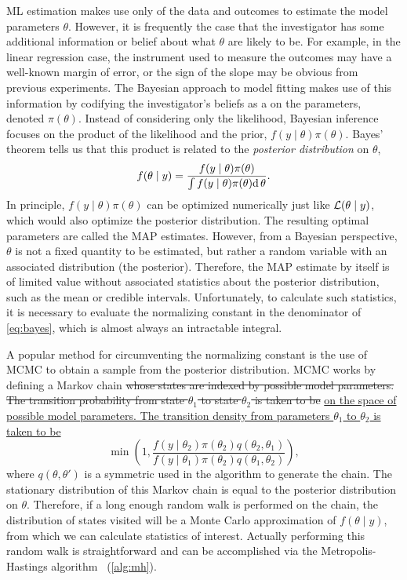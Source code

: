 \Gls{ML} estimation makes use only of the data and outcomes to estimate the
model parameters $\theta$. However, it is frequently the case that the
investigator has some additional information or belief about what $\theta$ are
likely to be. For example, in the linear regression case, the instrument used
to measure the outcomes may have a well-known margin of error, or the sign of
the slope may be obvious from previous experiments. The Bayesian approach to
model fitting makes use of this information by codifying the investigator's
beliefs as a  on the parameters, denoted
$\pi(\theta)$. Instead of considering only the likelihood, Bayesian inference
focuses on the product of the likelihood and the prior, $f(y \mid \theta)
\pi(\theta)$. Bayes' theorem tells us that this product is related to the
\textit{posterior distribution} on $\theta$,
\begin{align}
  f(\theta \mid y) 
    = \frac{f(y \mid \theta) \pi(\theta)}
           {\int f(y \mid \theta) \pi(\theta) \mathrm{d}\, \theta}.
  \label{eq:bayes}
\end{align}
In principle, $f(y \mid \theta) \pi(\theta)$ can be optimized numerically just
like $\mathcal{L}(\theta \mid y)$, which would also optimize the posterior distribution.
The resulting optimal parameters are called the \gls{MAP} estimates. However,
from a Bayesian perspective, $\theta$ is not a fixed quantity to be estimated,
but rather a random variable with an associated distribution (the posterior).
Therefore, the \gls{MAP} estimate by itself is of limited value without
associated statistics about the posterior distribution, such as the mean or
credible intervals. Unfortunately, to calculate such statistics, it is
necessary to evaluate the normalizing constant in the denominator of
\cref{eq:bayes}, which is almost always an intractable integral.

A popular method for circumventing the normalizing constant is the use of
\gls{MCMC} to obtain a sample from the posterior distribution. \Gls{MCMC} works
by defining a Markov chain {\color{red}\sout{whose states are indexed by
possible model parameters. The transition probability from state $\theta_1$ to
state $\theta_2$ is taken to be}} {\color{blue}\uline{on the space of possible
model parameters. The transition density from parameters $\theta_1$ to
$\theta_2$ is taken to be}}
\[
  \min\left(1, \frac{f(y \mid \theta_2) \pi(\theta_2) q(\theta_2, \theta_1)}
                    {f(y \mid \theta_1) \pi(\theta_2) q(\theta_1, \theta_2)} \right),
\]
where $q(\theta, \theta')$ is a symmetric  used in
the algorithm to generate the chain. The stationary distribution of this Markov
chain is equal to the posterior distribution on $\theta$. Therefore, if a long
enough random walk is performed on the chain, the distribution of states
visited will be a Monte Carlo approximation of $f(\theta \mid y)$, from
which we can calculate statistics of interest. Actually performing this random
walk is straightforward and can be accomplished via the Metropolis-Hastings
algorithm~\autocite{metropolis1953equation,hastings1970monte} (\cref{alg:mh}).

